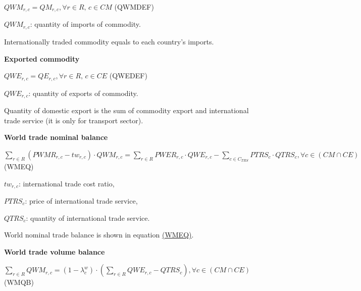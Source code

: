 \documentclass[10pt,a4paper,titlepage,dvipdfmx]{book}
\begin{document}
\begin{center}$QWM_{r,c}=QM_{r,c},\forall r\in R,\,c\in CM$ (QWMDEF)
\end{center}

\begin{flushleft} $QWM_{r,c}$: quantity of imports of commodity. \end{flushleft}

Internationally traded commodity equals to each country's imports.

\begin{flushleft}\textbf{Exported commodity}\end{flushleft}


\begin{center}$QWE_{r,c}=QE_{r,c},\forall r\in R,\,c\in CE$ (QWEDEF)
\end{center}

\begin{flushleft} $QWE_{r,c}$: quantity of exports of commodity. \end{flushleft}

Quantity of domestic export is the sum of commodity export and international trade service (it is only for transport sector). 

\begin{flushleft}\textbf{World trade nominal balance }\end{flushleft}


\begin{center}$\sum _{r\in R}\left(PWMR_{r,c}-tw_{r,c}\right)\cdot QWM_{r,c}=\sum _{r\in R}PWER_{r,c}\cdot QWE_{r,c}-\sum _{c\in {C_{TRS}}}PTRS_{c}\cdot QTRS_{c},\forall c\in \left(CM\cap CE\right)$ (WMEQ)\label{ref-0039}
\end{center}

\begin{flushleft}
$tw_{r,c}$: international trade cost ratio,

$PTRS_{c}$: price of international trade service,

$QTRS_{c}$: quantity of international trade service.
\end{flushleft}

World nominal trade balance is shown in equation {\hyperref[ref-0039]{(WMEQ)}}. 

\begin{flushleft}\textbf{World trade volume balance}\end{flushleft}


\begin{center}$\sum _{r\in R}QWM_{r,c}=\left(1-\lambda _{c}^{w}\right)\cdot \left(\sum _{r\in R}QWE_{r,c}-QTRS_{c}\right),\forall c\in \left(CM\cap CE\right)$ (WMQB)
\end{center}
\end{document}
